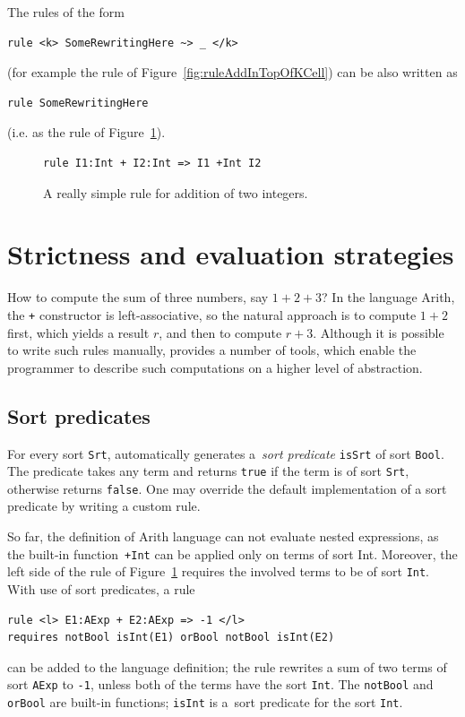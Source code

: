 \documentclass[nolot,nolof,nocover,printed]{fithesis3}
\begin{document}

The rules of the form
\begin{lstlisting}
rule <k> SomeRewritingHere ~> _ </k>
\end{lstlisting}
(for example the rule of Figure~\ref{fig:ruleAddInTopOfKCell}) can be also written as
\begin{lstlisting}
rule SomeRewritingHere
\end{lstlisting}
(i.e. as the rule of Figure~\ref{fig:simpleAdd}).

\begin{figure}[ht]
\begin{lstlisting}
rule I1:Int + I2:Int => I1 +Int I2
\end{lstlisting}
\caption{A really simple rule for addition of two integers.}
\label{fig:simpleAdd}
\end{figure}

\section{Strictness and evaluation strategies} \label{sec:k:strictness}

How to compute the sum of three numbers, say $1 + 2 + 3$? In the language Arith, the \texttt{+} constructor is left-associative, so the natural approach is to compute $1 + 2$ first, which yields a result $r$, and then to compute $r + 3$. Although it is possible to write such rules manually, \K provides a number of tools, which enable the programmer to describe such computations on a higher level of abstraction.

\subsection{Sort predicates}

For every sort \texttt{Srt}, \K automatically generates a~\textit{sort predicate} \texttt{isSrt} of sort \texttt{Bool}. The predicate takes any term and returns \texttt{true} if the term is of sort \texttt{Srt}, otherwise returns \texttt{false}. One may override the default implementation of a sort predicate by writing a custom rule.

So far, the definition of Arith language can not evaluate nested expressions, as the built-in function~\texttt{+Int} can be applied only on terms of sort Int. Moreover, the left side of the rule of Figure~\ref{fig:simpleAdd} requires the involved terms to be of sort \texttt{Int}. With use of sort predicates, a rule
\begin{lstlisting}
rule <l> E1:AExp + E2:AExp => -1 </l>
requires notBool isInt(E1) orBool notBool isInt(E2)
\end{lstlisting}
can be added to the language definition; the rule rewrites a sum of two terms of sort \texttt{AExp} to \lstinline|-1|, unless both of the terms have the sort \texttt{Int}. The \texttt{notBool} and \texttt{orBool} are built-in functions; \texttt{isInt} is a~sort predicate for the sort \texttt{Int}.
\end{document}
